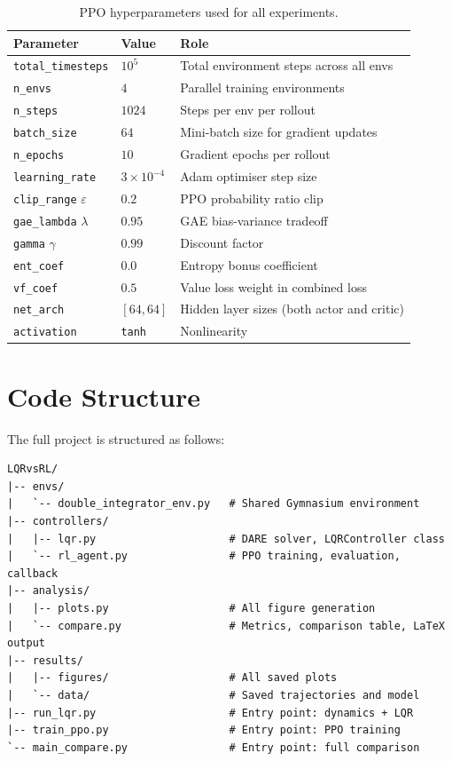 \documentclass[11pt, a4paper]{article}
\begin{document}
\begin{table}[H]
  \centering
  \caption{PPO hyperparameters used for all experiments.}
  \label{tab:hp}
  \begin{tabular}{llp{6.5cm}}
    \toprule
    \textbf{Parameter} & \textbf{Value} & \textbf{Role} \\
    \midrule
    \texttt{total\_timesteps} & $10^5$ & Total environment steps across all envs \\
    \texttt{n\_envs}          & $4$    & Parallel training environments \\
    \texttt{n\_steps}         & $1024$ & Steps per env per rollout \\
    \texttt{batch\_size}      & $64$   & Mini-batch size for gradient updates \\
    \texttt{n\_epochs}        & $10$   & Gradient epochs per rollout \\
    \texttt{learning\_rate}   & $3\times10^{-4}$ & Adam optimiser step size \\
    \texttt{clip\_range} $\varepsilon$ & $0.2$ & PPO probability ratio clip \\
    \texttt{gae\_lambda} $\lambda$ & $0.95$ & GAE bias-variance tradeoff \\
    \texttt{gamma} $\gamma$   & $0.99$ & Discount factor \\
    \texttt{ent\_coef}        & $0.0$  & Entropy bonus coefficient \\
    \texttt{vf\_coef}         & $0.5$  & Value loss weight in combined loss \\
    \texttt{net\_arch}        & $[64, 64]$ & Hidden layer sizes (both actor and critic) \\
    \texttt{activation}       & \texttt{tanh} & Nonlinearity \\
    \bottomrule
  \end{tabular}
\end{table}

\section{Code Structure}
\label{app:code}

The full project is structured as follows:

\begin{verbatim}
LQRvsRL/
|-- envs/
|   `-- double_integrator_env.py   # Shared Gymnasium environment
|-- controllers/
|   |-- lqr.py                     # DARE solver, LQRController class
|   `-- rl_agent.py                # PPO training, evaluation, callback
|-- analysis/
|   |-- plots.py                   # All figure generation
|   `-- compare.py                 # Metrics, comparison table, LaTeX output
|-- results/
|   |-- figures/                   # All saved plots
|   `-- data/                      # Saved trajectories and model
|-- run_lqr.py                     # Entry point: dynamics + LQR
|-- train_ppo.py                   # Entry point: PPO training
`-- main_compare.py                # Entry point: full comparison
\end{verbatim}
\end{document}
